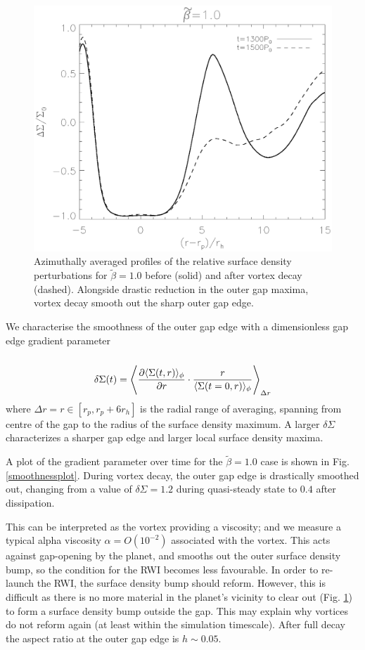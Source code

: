 \begin{figure}
  \includegraphics[width=\linewidth]{figures/gapchange}
  \caption{Azimuthally averaged profiles of the relative surface
    density perturbations for  $\tilde\beta=1.0$
    before (solid) and after vortex decay
    (dashed). Alongside drastic reduction in the outer gap maxima, vortex decay
    smooth out the sharp outer gap edge.
    \label{gap_smoothed}} 
\end{figure}

We characterise the smoothness of the outer gap edge with a dimensionless
gap edge gradient parameter
\begin{align}
  \delta\Sigma(t)= \la \frac{\partial \langle \Sigma(t,r)
    \rangle_{\phi}}{\partial r} \cdot \frac{r}{\langle \Sigma(t=0,r)
    \rangle_{\phi}} \ra_{\Delta r}  
\end{align}
where $\Delta r = r\in [r_p,r_p + 6r_h]$ is the radial range of averaging, spanning
from centre of the gap to the radius of the surface density maximum.
A larger $\delta \Sigma$ characterizes a sharper gap edge and  
larger local surface density maxima.   

A plot of the gradient parameter over time
for the $\tilde\beta=1.0$ case is shown in Fig. \ref{smoothnessplot}.
During vortex decay, the outer gap edge is 
drastically smoothed out, changing from a value of $\delta\Sigma=1.2$ during
quasi-steady state to $0.4$ after dissipation. 

This can be interpreted as the vortex providing a viscosity;  
and we measure a typical alpha viscosity $\alpha = O(10^{-2})$
associated with the vortex. This acts against gap-opening
by the planet, and smooths out the outer surface density bump,    
 so the condition for the RWI 
becomes less favourable. In
  order to re-launch the RWI, the surface density bump should
  reform. However, this is difficult as there is no more material
  in the planet's vicinity to clear out (Fig. \ref{gap_smoothed}) to
  form a surface density bump outside the gap. This may explain
why vortices do  not reform again (at least within the simulation
timescale).  After full decay the aspect ratio at the outer gap edge is
  $h\sim0.05$. 

